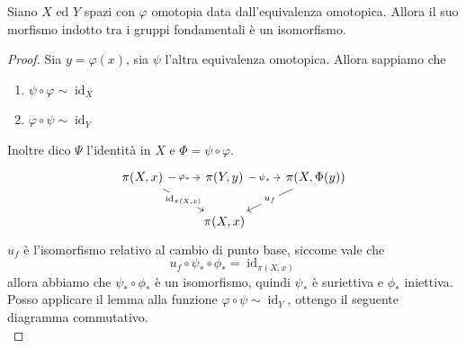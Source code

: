\begin{corollary} Siano $X$ ed $Y$ spazi con $\varphi$ omotopia data dall'equivalenza omotopica. Allora il suo morfismo indotto tra i gruppi fondamentali è un isomorfismo.
\end{corollary}
\begin{proof} Sia $y=\varphi(x)$, sia $\psi$ l'altra equivalenza omotopica. Allora sappiamo che 
	\begin{enumerate}
		\item 	$\psi \circ \varphi \sim \operatorname{id}_X$
		\item	$\varphi \circ \psi \sim \operatorname{id}_Y$ 
	\end{enumerate}
Inoltre dico $\Psi$ l'identità in $X$ e $\Phi=\psi \circ \varphi$.
	\begin{equation*}
	\begin{tikzcd}
	{\pi(X,x)} \arrow[rd, "{\operatorname{id}_{\pi(X,x)}}" description] \arrow[r, "\varphi_*" description] & {\pi(Y,y)} \arrow[r, "\psi_*" description] & {\pi(X,\Phi(y))} \arrow[ld, "u_f" description] \\
	& {\pi(X,x)}                                 &                                               
	\end{tikzcd}
	\end{equation*}
	$u_f$ è l'isomorfismo relativo al cambio di punto base, siccome vale che 
	\begin{equation*}
	u_f \circ \psi_* \circ \phi_* = \operatorname{id}_{\pi(X,x)}
	\end{equation*}
	allora abbiamo che $\psi_* \circ \phi_*$ è un isomorfismo, quindi $\psi_*$ è suriettiva e $\phi_*$ iniettiva. Posso applicare il lemma alla funzione $\varphi \circ \psi \sim \operatorname{id}_Y$, ottengo il seguente diagramma commutativo.
	\begin{equation*}

\end{equation*}
\end{proof}
